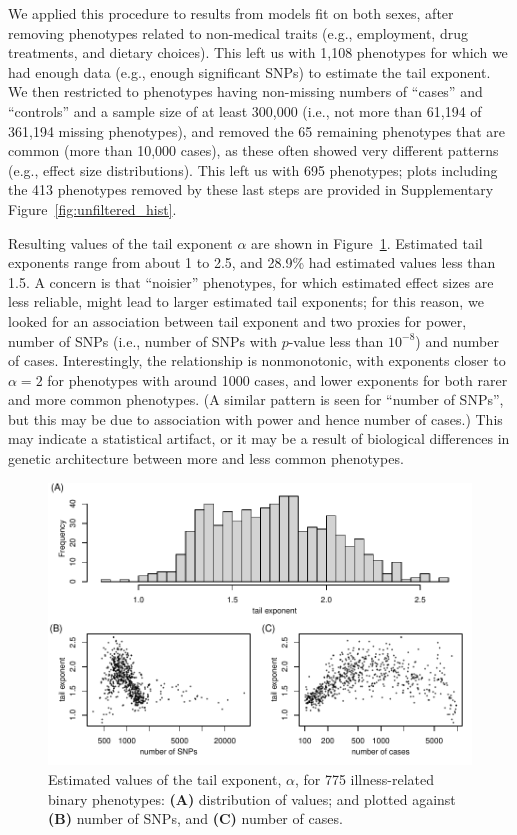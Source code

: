 \documentclass{article}
\newcommand{\1}{\mathbbm{1}}
\theoremstyle{remark}
\theoremstyle{definition}
\begin{document}
We applied this procedure to results from models fit on both sexes,
after removing phenotypes related to non-medical traits
(e.g., employment, drug treatments, and dietary choices).
This left us with 1,108 phenotypes for which we had enough data (e.g., enough significant SNPs)
to estimate the tail exponent.
We then restricted to phenotypes having non-missing numbers of ``cases'' and ``controls''
and a sample size of at least 300,000 (i.e., not more than 61,194 of 361,194 missing phenotypes),
and removed the 65 remaining phenotypes that are common (more than 10,000 cases),
as these often showed very different patterns
(e.g., effect size distributions).
This left us with 695 phenotypes;
plots including the 413 phenotypes removed by these last steps are provided in
Supplementary Figure~\ref{fig:unfiltered_hist}.

Resulting values of the tail exponent $\alpha$ are shown in Figure~\ref{fig:exponent_hist}.
Estimated tail exponents range from about 1 to 2.5,
and 28.9\% had estimated values less than 1.5.
A concern is that ``noisier'' phenotypes,
for which estimated effect sizes are less reliable,
might lead to larger estimated tail exponents;
for this reason, we looked for an association between
tail exponent and two proxies for power,
number of SNPs (i.e., number of SNPs with $p$-value less than $10^{-8}$)
and number of cases.
Interestingly, the relationship is nonmonotonic,
with exponents closer to $\alpha=2$ for phenotypes with around 1000 cases,
and lower exponents for both rarer and more common phenotypes.
(A similar pattern is seen for ``number of SNPs'',
but this may be due to association with power and hence number of cases.)
This may indicate a statistical artifact,
or it may be a result of biological differences in genetic architecture
between more and less common phenotypes.

\begin{figure}
    \begin{center}
    \includegraphics{snp_effects/results_10}
    \end{center}
    \caption{
        Estimated values of the tail exponent, $\alpha$,
        for 775 illness-related binary phenotypes:
        \textbf{(A)} distribution of values; and plotted against
        \textbf{(B)} number of SNPs, and
        \textbf{(C)} number of cases.
        \label{fig:exponent_hist}
    }
\end{figure}
\end{document}
